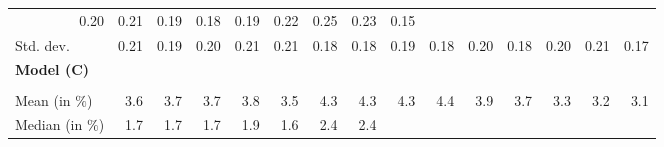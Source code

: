\begin{tabular}{lllllllllllllll}
  \multicolumn{1}{r}{0.20} &
  \multicolumn{1}{r}{0.21} &
  \multicolumn{1}{r}{0.19} &
  \multicolumn{1}{r}{0.18} &
  \multicolumn{1}{r}{0.19} &
  \multicolumn{1}{r}{0.22} &
  \multicolumn{1}{r}{0.25} &
  \multicolumn{1}{r}{0.23} &
  \multicolumn{1}{r}{0.15} \\
\multicolumn{1}{l}{\hspace{2em}Std. dev.} &
  \multicolumn{1}{|r}{0.21} &
  \multicolumn{1}{r}{0.19} &
  \multicolumn{1}{r}{0.20} &
  \multicolumn{1}{r}{0.21} &
  \multicolumn{1}{r}{0.21} &
  \multicolumn{1}{r}{0.18} &
  \multicolumn{1}{r}{0.18} &
  \multicolumn{1}{r}{0.19} &
  \multicolumn{1}{r}{0.18} &
  \multicolumn{1}{r}{0.20} &
  \multicolumn{1}{r}{0.18} &
  \multicolumn{1}{r}{0.20} &
  \multicolumn{1}{r}{0.21} &
  \multicolumn{1}{r}{0.17} \\
\multicolumn{1}{l}{{\textbf{Model (C)}}} &
  \multicolumn{1}{|r}{} &
  \multicolumn{1}{r}{} &
  \multicolumn{1}{r}{} &
  \multicolumn{1}{r}{} &
  \multicolumn{1}{r}{} &
  \multicolumn{1}{r}{} &
  \multicolumn{1}{r}{} &
  \multicolumn{1}{r}{} &
  \multicolumn{1}{r}{} &
  \multicolumn{1}{r}{} &
  \multicolumn{1}{r}{} &
  \multicolumn{1}{r}{} &
  \multicolumn{1}{r}{} &
  \multicolumn{1}{r}{} \\
\multicolumn{1}{l}{\hspace{1em}{\textit{Additive term} ($\widehat{t}^{add}/\widetilde{p}$)}} &
  \multicolumn{1}{|r}{} &
  \multicolumn{1}{r}{} &
  \multicolumn{1}{r}{} &
  \multicolumn{1}{r}{} &
  \multicolumn{1}{r}{} &
  \multicolumn{1}{r}{} &
  \multicolumn{1}{r}{} &
  \multicolumn{1}{r}{} &
  \multicolumn{1}{r}{} &
  \multicolumn{1}{r}{} &
  \multicolumn{1}{r}{} &
  \multicolumn{1}{r}{} &
  \multicolumn{1}{r}{} &
  \multicolumn{1}{r}{} \\
\multicolumn{1}{l}{\hspace{2em}Mean (in $\%$)} &
  \multicolumn{1}{|r}{3.6} &
  \multicolumn{1}{r}{3.7} &
  \multicolumn{1}{r}{3.7} &
  \multicolumn{1}{r}{3.8} &
  \multicolumn{1}{r}{3.5} &
  \multicolumn{1}{r}{4.3} &
  \multicolumn{1}{r}{4.3} &
  \multicolumn{1}{r}{4.3} &
  \multicolumn{1}{r}{4.4} &
  \multicolumn{1}{r}{3.9} &
  \multicolumn{1}{r}{3.7} &
  \multicolumn{1}{r}{3.3} &
  \multicolumn{1}{r}{3.2} &
  \multicolumn{1}{r}{3.1} \\
\multicolumn{1}{l}{\hspace{2em}Median (in $\%$)} &
  \multicolumn{1}{|r}{1.7} &
  \multicolumn{1}{r}{1.7} &
  \multicolumn{1}{r}{1.7} &
  \multicolumn{1}{r}{1.9} &
  \multicolumn{1}{r}{1.6} &
  \multicolumn{1}{r}{2.4} &
  \multicolumn{1}{r}{2.4} &

\end{tabular}
